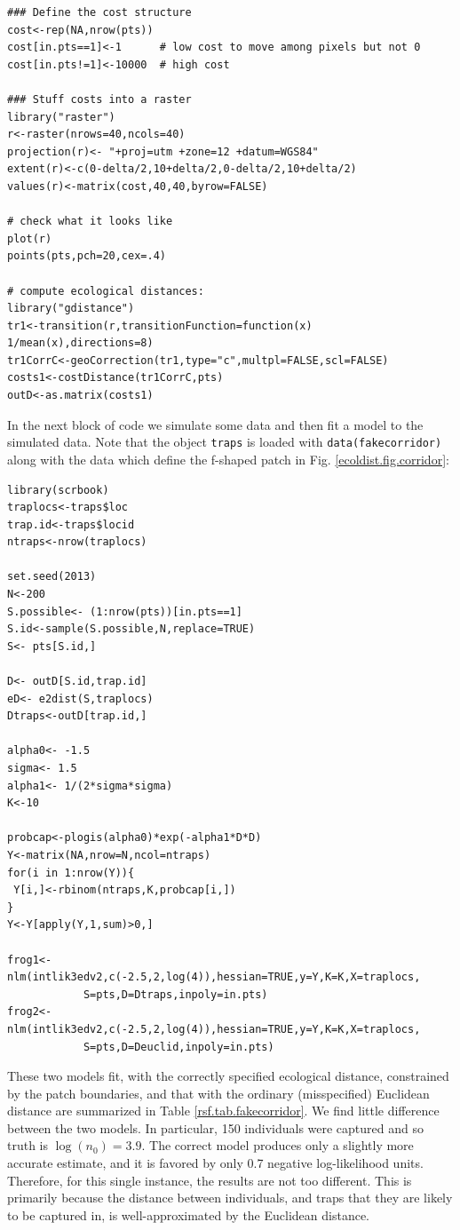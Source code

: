 {\small
\begin{verbatim}
### Define the cost structure
cost<-rep(NA,nrow(pts))
cost[in.pts==1]<-1      # low cost to move among pixels but not 0
cost[in.pts!=1]<-10000  # high cost

### Stuff costs into a raster
library("raster")
r<-raster(nrows=40,ncols=40)
projection(r)<- "+proj=utm +zone=12 +datum=WGS84"
extent(r)<-c(0-delta/2,10+delta/2,0-delta/2,10+delta/2)
values(r)<-matrix(cost,40,40,byrow=FALSE)

# check what it looks like
plot(r)
points(pts,pch=20,cex=.4)

# compute ecological distances:
library("gdistance")
tr1<-transition(r,transitionFunction=function(x) 1/mean(x),directions=8)
tr1CorrC<-geoCorrection(tr1,type="c",multpl=FALSE,scl=FALSE)
costs1<-costDistance(tr1CorrC,pts)
outD<-as.matrix(costs1)
\end{verbatim}
}

In the next block of code we simulate some data and then fit a model
to the simulated data.  Note that the object \mbox{\tt traps} is
loaded with \mbox{\tt data(fakecorridor)} along with the data which
define the f-shaped patch in
Fig. \ref{ecoldist.fig.corridor}:
{\small
\begin{verbatim}
library(scrbook)
traplocs<-traps$loc
trap.id<-traps$locid
ntraps<-nrow(traplocs)

set.seed(2013)
N<-200
S.possible<- (1:nrow(pts))[in.pts==1]
S.id<-sample(S.possible,N,replace=TRUE)
S<- pts[S.id,]

D<- outD[S.id,trap.id]
eD<- e2dist(S,traplocs)
Dtraps<-outD[trap.id,]

alpha0<- -1.5
sigma<- 1.5
alpha1<- 1/(2*sigma*sigma)
K<-10

probcap<-plogis(alpha0)*exp(-alpha1*D*D)
Y<-matrix(NA,nrow=N,ncol=ntraps)
for(i in 1:nrow(Y)){
 Y[i,]<-rbinom(ntraps,K,probcap[i,])
}
Y<-Y[apply(Y,1,sum)>0,]

frog1<-nlm(intlik3edv2,c(-2.5,2,log(4)),hessian=TRUE,y=Y,K=K,X=traplocs,
            S=pts,D=Dtraps,inpoly=in.pts)
frog2<-nlm(intlik3edv2,c(-2.5,2,log(4)),hessian=TRUE,y=Y,K=K,X=traplocs,
            S=pts,D=Deuclid,inpoly=in.pts)
\end{verbatim}
}

These two models fit, with the correctly specified ecological
distance, constrained by the patch boundaries, and that with the
ordinary (misspecified) Euclidean distance are summarized in Table \ref{rsf.tab.fakecorridor}.
We find little difference between the two models. In
particular, 150 individuals were captured and so truth is $\log(n_{0}) = 3.9$.
The correct model produces only a slightly more accurate  estimate, and
it is favored by only 0.7 negative log-likelihood units.
Therefore, for this single instance, the results are not too different.
This is primarily because
 the distance between individuals, and traps that they are likely
to be captured in, is well-approximated by the Euclidean distance.



